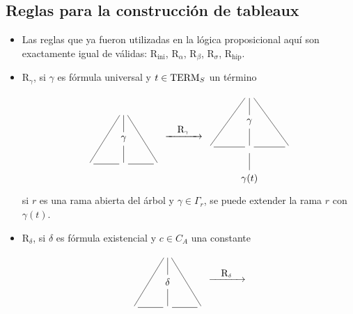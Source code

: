 \subsection{Reglas para la construcción de tableaux}
\begin{itemize}
	\item Las reglas que ya fueron utilizadas en la lógica proposicional aquí son exactamente igual de válidas: $\mbox{R}_{\mbox{ini}}$, $\mbox{R}_{\alpha}$, $\mbox{R}_{\beta}$, $\mbox{R}_\sigma$, $\mbox{R}_{\mbox{hip}}$.
	\item $\mbox{R}_{\gamma}$, si $\gamma$ es fórmula universal y $t \in \mbox{TERM}_{S}$ un término
	\[\begin{tikzcd}
                      & {} \arrow[d, no head] \arrow[ldd, no head] \arrow[rdd, no head] &    \\
                      & \gamma \arrow[d, no head]                                       &    \\
{} \arrow[r, no head] & {} \arrow[r, no head]                                           & {}
\end{tikzcd} \xrightarrow{\quad \mbox{R}_{\gamma} \quad} \begin{tikzcd}
                      & {} \arrow[d, no head] \arrow[ldd, no head] \arrow[rdd, no head] &    \\
                      & \gamma \arrow[d, no head]                                       &    \\
{} \arrow[r, no head] & {} \arrow[r, no head] \arrow[d, no head]                        & {} \\
                      & \gamma(t)                                                        &   
\end{tikzcd} \]
si $r$ es una rama abierta del árbol y $\gamma \in \Gamma_r$, se puede extender la rama $r$ con $\gamma(t)$.
\item $\mbox{R}_{\delta}$, si $\delta$ es fórmula existencial y $c \in C_A$ una constante 
	\[\begin{tikzcd}
                      & {} \arrow[d, no head] \arrow[ldd, no head] \arrow[rdd, no head] &    \\
                      & \delta \arrow[d, no head]                                       &    \\
{} \arrow[r, no head] & {} \arrow[r, no head]                                           & {}
\end{tikzcd} \xrightarrow{\quad \mbox{R}_{\delta} \quad} \begin{tikzcd}

\end{tikzcd}\]
\end{itemize}
